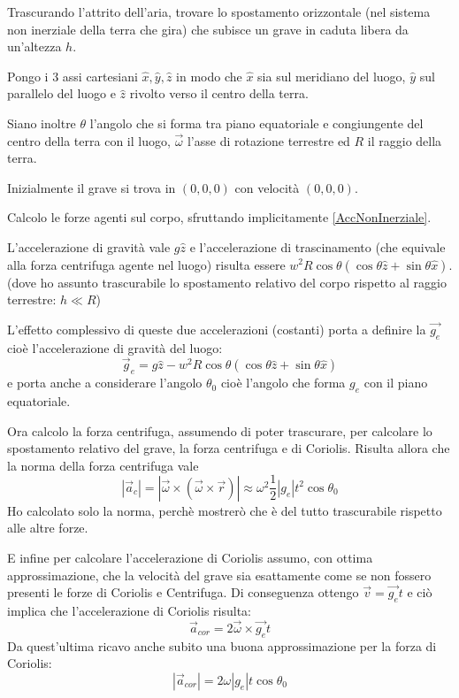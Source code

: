 \documentclass[../main.tex]{subfiles}
\begin{document}

\textex
Trascurando l'attrito dell'aria, trovare lo spostamento orizzontale (nel sistema non inerziale della terra che gira) che subisce un
grave in caduta libera da un'altezza $h$.


\solution
Pongo i 3 assi cartesiani $\hat{x}, \hat{y}, \hat{z}$ in modo che $\hat{x}$ sia sul meridiano del luogo, $\hat{y}$ sul parallelo del luogo
e $\hat{z}$ rivolto verso il centro della terra.

Siano inoltre $\theta$ l'angolo che si forma tra piano equatoriale e congiungente del centro della terra con il luogo, $\vec{\omega}$
l'asse di rotazione terrestre ed $R$ il raggio della terra.

Inizialmente il grave si trova in $(0,0,0)$ con velocità $(0,0,0)$.

Calcolo le forze agenti sul corpo, sfruttando implicitamente \cref{AccNonInerziale}.

L'accelerazione di gravità vale $g\hat{z}$ e l'accelerazione di trascinamento (che equivale
alla forza centrifuga agente nel luogo) risulta essere 
$w^2R\cos\theta\left(\cos\theta\hat{z}+\sin\theta\hat{x}\right)$. (dove ho assunto trascurabile lo spostamento relativo del corpo
rispetto al raggio terrestre: $h\ll R$)

L'effetto complessivo di queste due accelerazioni (costanti) porta a definire la $\vec{g_e}$ cioè l'accelerazione di gravità
del luogo:
\begin{equation}\label{cgt:geff}
	\vec g_e=g\hat{z}-w^2R\cos\theta\left(\cos\theta\hat{z}+\sin\theta\hat{x}\right)
\end{equation}
e porta anche a considerare l'angolo $\theta_0$ cioè l'angolo che forma $g_e$ con il piano equatoriale.

Ora calcolo la forza centrifuga, assumendo di poter trascurare, per calcolare lo spostamento relativo del grave,
la forza centrifuga e di Coriolis. Risulta allora che la norma della forza centrifuga vale
\begin{equation}\label{cgt:centrifuga}
	|\vec a_c|=|\vec{\omega}\times(\vec{\omega}\times \vec r) | \approx \omega^2\frac 12|g_e|t^2\cos \theta_0
\end{equation}
Ho calcolato solo la norma, perchè mostrerò che è del tutto trascurabile rispetto alle altre forze.

E infine per calcolare l'accelerazione di Coriolis assumo, con ottima approssimazione, che la velocità 
del grave sia esattamente come se non fossero presenti le forze di Coriolis e Centrifuga. Di conseguenza ottengo
$\vec{v}=\vec{g_e}t$ e ciò implica che l'accelerazione di Coriolis risulta:
\begin{equation}\label{cgt:Coriolis}
	\vec  a_{cor}=2\vec \omega \times \vec{g_e} t
\end{equation}
Da quest'ultima ricavo anche subito una buona approssimazione per la forza di Coriolis:
\begin{equation}\label{cgt:CoriolisApprox}
	|\vec a_{cor}| =2\omega|g_e| t\cos \theta_0 
\end{equation}
\end{document}
